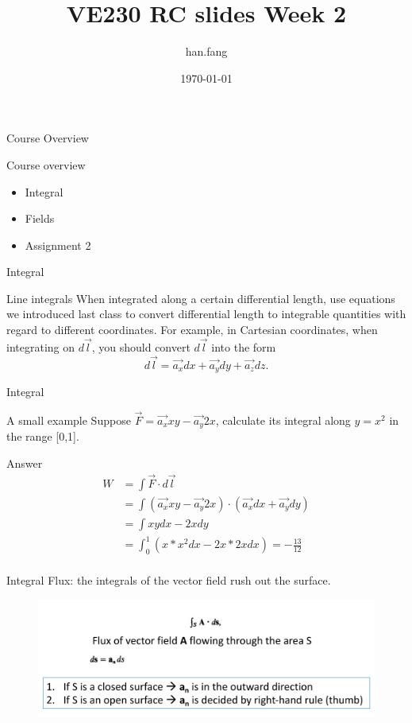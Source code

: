 \documentclass[xcolor={dvipsnames}]{beamer}
\title[VE230 RC slides week 1]{VE230 RC slides Week 2}
\author{han.fang }
\date{\today}
\begin{document}
\begin{frame}
\titlepage
\end{frame}


\begin{frame}{Course Overview}
\begin{block}{Course overview}
\begin{itemize}
	\item Integral
	\item Fields
	\item Assignment 2
\end{itemize}
\end{block}
\end{frame}
\begin{frame}{Integral}
\begin{block}{Line integrals}
When integrated along a certain differential length, use equations we introduced last class to convert differential length to integrable quantities with regard to different coordinates. For example, in Cartesian coordinates, when integrating on $d\vec{l}$, you should convert $d\vec{l}$ into the form
$$d\vec{l} = \vec{a_x}dx + \vec{a_y}dy + \vec{a_z}dz.$$
\end{block}
\end{frame}
\begin{frame}{Integral}
\begin{block}{A small example}
Suppose $\vec{F}=\vec{a_x}xy - \vec{a_y}2x$, calculate its integral along $y=x^2$ in the range [0,1].
\end{block}
\pause 
\begin{block}{Answer}
\[
\begin{aligned}
W&=\int \vec{F}\cdot d\vec{l}\\
&=\int (\vec{a_x}xy - \vec{a_y}2x)\cdot (\vec{a_x}dx + \vec{a_y}dy)\\
&=\int xydx-2xdy\\
&=\int_0^1 (x*x^2dx-2x*2xdx)=-\frac{13}{12}\\
\end{aligned}
\]
\end{block}
\end{frame}
\begin{frame}{Integral}
Flux: the integrals of the vector field rush out the surface.
\begin{figure}[H]
	\centering
	\includegraphics[width=0.7\linewidth]{2_1.png}
\end{figure}
\end{frame}
\end{document}
